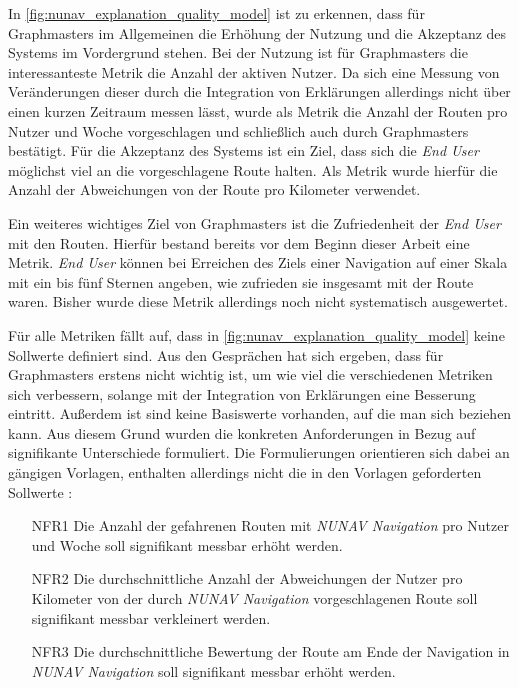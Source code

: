In \autoref{fig:nunav_explanation_quality_model} ist zu erkennen, dass für Graphmasters im Allgemeinen die Erhöhung der Nutzung und die Akzeptanz des Systems im Vordergrund stehen. Bei der Nutzung ist für Graphmasters die interessanteste Metrik die Anzahl der aktiven Nutzer. Da sich eine Messung von Veränderungen dieser durch die Integration von Erklärungen allerdings nicht über einen kurzen Zeitraum messen lässt, wurde  als Metrik die Anzahl der Routen pro Nutzer und Woche vorgeschlagen und schließlich auch durch Graphmasters bestätigt. Für die Akzeptanz des Systems ist ein Ziel, dass sich die \textit{End User} möglichst viel an die vorgeschlagene Route halten. Als Metrik wurde hierfür die Anzahl der Abweichungen von der Route pro Kilometer verwendet.

Ein weiteres wichtiges Ziel von Graphmasters ist die Zufriedenheit der \textit{End User} mit den Routen. Hierfür bestand bereits vor dem Beginn dieser Arbeit eine Metrik. \textit{End User} können bei Erreichen des Ziels einer Navigation auf einer Skala mit ein bis fünf Sternen angeben, wie zufrieden sie insgesamt mit der Route waren. Bisher wurde diese Metrik allerdings noch nicht systematisch ausgewertet.

Für alle Metriken fällt auf, dass in \autoref{fig:nunav_explanation_quality_model} keine Sollwerte definiert sind. Aus den Gesprächen hat sich ergeben, dass für Graphmasters erstens nicht wichtig ist, um wie viel die verschiedenen Metriken sich verbessern, solange mit der Integration von Erklärungen eine Besserung eintritt. Außerdem ist sind keine Basiswerte vorhanden, auf die man sich beziehen kann. Aus diesem Grund wurden die konkreten Anforderungen in Bezug auf signifikante Unterschiede formuliert. Die Formulierungen orientieren sich dabei an gängigen Vorlagen, enthalten allerdings nicht die in den Vorlagen geforderten Sollwerte \cite{rajnish2010quality, alexander2002writing}:

\begin{enumerate}
    \item [NFR1] Die Anzahl der gefahrenen Routen mit \textit{NUNAV Navigation} pro Nutzer und Woche soll signifikant messbar erhöht werden.
    \item [NFR2] Die durchschnittliche Anzahl der Abweichungen der Nutzer pro Kilometer von der durch \textit{NUNAV Navigation} vorgeschlagenen Route soll signifikant messbar verkleinert werden.
    \item [NFR3] Die durchschnittliche Bewertung der Route am Ende der Navigation in \textit{NUNAV Navigation} soll signifikant messbar erhöht werden.
\end{enumerate}

